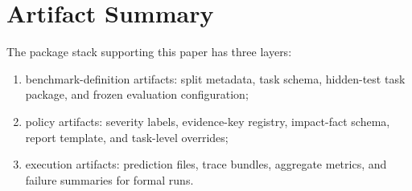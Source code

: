 \documentclass{article}
\begin{document}
\section{Artifact Summary}

The package stack supporting this paper has three layers:
\begin{enumerate}[leftmargin=1.2em]
    \item benchmark-definition artifacts: split metadata, task schema, hidden-test task package, and frozen evaluation configuration;
    \item policy artifacts: severity labels, evidence-key registry, impact-fact schema, report template, and task-level overrides;
    \item execution artifacts: prediction files, trace bundles, aggregate metrics, and failure summaries for formal runs.
\end{enumerate}
\end{document}

